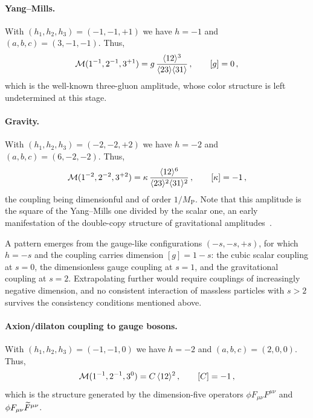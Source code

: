 \paragraph{Yang--Mills.}
With $(h_1,h_2,h_3)=(-1,-1,+1)$ we have $h=-1$ and $(a,b,c)=(3,-1,-1)$. Thus,
    \begin{equation}
        \mathcal M (1^{-1},2^{-1},3^{+1}) = g\,\frac{\langle 1 2 \rangle^3}{\langle 2 3 \rangle\langle 3 1 \rangle}\,,
        \qquad [g]=0\,,
    \end{equation}
which is the well-known three-gluon amplitude, whose color structure is left undetermined at this stage.

\paragraph{Gravity.}
With $(h_1,h_2,h_3)=(-2,-2,+2)$ we have $h=-2$ and $(a,b,c)=(6,-2,-2)$. Thus,
    \begin{equation}
        \mathcal M (1^{-2},2^{-2},3^{+2}) = \kappa\,\frac{\langle 1 2 \rangle^6}{\langle 2 3 \rangle^2\langle 3 1 \rangle^2}\,,
        \qquad [\kappa]=-1\,,
    \end{equation}
the coupling being dimensionful and of order $1/M_{\text{P}}$. Note that this
amplitude is the square of the Yang--Mills one divided by the scalar one, an early
manifestation of the double-copy structure of gravitational amplitudes~\cite{Kawai:1985xq,Bern:2008qj,Bern:2010ue,Carrasco:2015iwa,Bern:2022wqg,Bern:2019prr}.

A pattern emerges from the gauge-like configurations $(-s,-s,+s)$, for which $h=-s$ and the coupling
carries dimension $[g]=1-s$: the cubic scalar coupling at $s=0$, the dimensionless gauge coupling at
$s=1$, and the gravitational coupling at $s=2$. Extrapolating further would require couplings of
increasingly negative dimension, and no consistent interaction of massless particles with
$s>2$ survives the consistency conditions mentioned above.

\paragraph{Axion/dilaton coupling to gauge bosons.}
With $(h_1,h_2,h_3)=(-1,-1,0)$ we have $h=-2$ and
$(a,b,c)=(2,0,0)$. Thus,
    \begin{equation}
        \mathcal M (1^{-1},2^{-1},3^{0}) = C\,\langle 1 2 \rangle^2\,,\qquad [C]=-1\,,
    \end{equation}
which is the structure generated by the dimension-five operators 
$\phi F_{\mu\nu}F^{\mu\nu}$ and $\phi F_{\mu\nu}\widetilde{F}^{\mu\nu}$.

